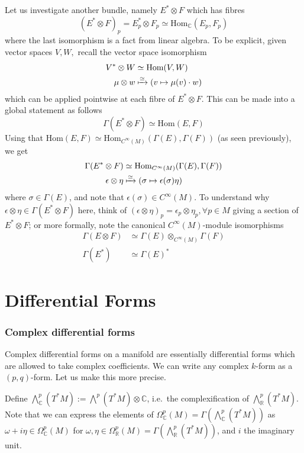 \documentclass[a4paper]{article}
\theoremstyle{definition} \newtheorem*{definition}{Definition}
\theoremstyle{definition} \newtheorem*{definitions}{Definitions}
\theoremstyle{plain} \newtheorem{theorem}{Theorem}[section]
\theoremstyle{plain} \newtheorem{proposition}[theorem]{Proposition}
\theoremstyle{plain} \newtheorem{corollary}[theorem]{Corollary}
\theoremstyle{plain} \newtheorem{lemma}[theorem]{Lemma}
\theoremstyle{plain} \newtheorem{example}[theorem]{Example}
\newcommand{\realnos}{\mathbb{R}}
\newcommand{\complexnos}{\mathbb{C}}
\begin{document}
Let us investigate another bundle, namely $E^*\otimes F$ which has fibres 
$$(E^*\otimes F)_p=E_p^*\otimes F_p\simeq \text{Hom}_\complexnos (E_p, F_p)$$
where the last isomorphism is a fact from linear algebra. To be explicit, given vector spaces $V, W,$ recall the vector space isomorphism
\begin{align*}
V^*\otimes W & \simeq \text{Hom}(V, W) \\
\mu \otimes w & \xmapsto{\simeq} (v \mapsto \mu(v)\cdot w)
\end{align*}
which can be applied pointwise at each fibre of $E^*\otimes F$. This can be made into a global statement as follows 
$$\Gamma(E^*\otimes F)\simeq \text{Hom}(E,F)$$
Using that $\text{Hom}(E,F)\simeq \text{Hom}_{C^\infty (M)}(\Gamma(E), \Gamma(F))$ (as seen previously), we get
\begin{align*}
\Gamma(E^*\otimes F) & \simeq \text{Hom}_{C^\infty (M)}(\Gamma(E), \Gamma(F)) \\
\epsilon \otimes \eta & \xmapsto{\simeq} (\sigma \mapsto \epsilon(\sigma) \eta)
\end{align*}
where $\sigma\in \Gamma(E)$, and note that $\epsilon(\sigma)\in C^\infty (M)$. To understand why $\epsilon \otimes \eta\in \Gamma(E^*\otimes F)$ here, think of $(\epsilon \otimes \eta)_p=\epsilon_p \otimes \eta_p, \forall p\in M$ giving a section of $E^*\otimes F$; or more formally, note the canonical $C^\infty(M)$-module isomorphisms
\begin{align*}
\Gamma(E\otimes F) & \simeq \Gamma(E)\otimes_{C^\infty (M)} \Gamma(F) \\
\Gamma(E^*) & \simeq \Gamma(E)^* 
\end{align*}

\section{Differential Forms}

\subsubsection{Complex differential forms}
Complex differential forms on a manifold are essentially differential forms which are allowed to take complex coefficients. We can write any complex $k$-form as a $(p,q)$-form. Let us make this more precise.

Define $\bigwedge^p_\complexnos(T^\ast M):=\bigwedge^p (T^\ast M)\otimes \complexnos$, i.e.\ the complexification of $\bigwedge^p_\realnos(T^\ast M)$. Note that we can express the elements of $\Omega^p_\complexnos(M)=\Gamma(\bigwedge^p_\complexnos(T^\ast M))$ as $\omega+i\eta \in \Omega^p_\complexnos(M)$ for $\omega, \eta \in \Omega_\realnos ^p(M) = \Gamma(\bigwedge^p_\realnos(T^\ast M))$, and $i$ the imaginary unit.
\end{document}
